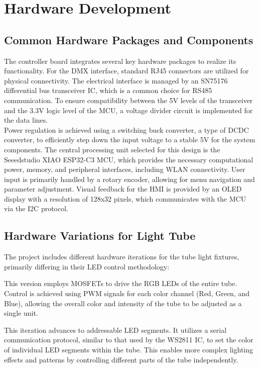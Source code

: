 \section{Hardware Development}
\label{sec:hardware_development}

\subsection{Common Hardware Packages and Components}

The controller board integrates several key hardware packages to realize its functionality. For the \ac{DMX} interface, standard \ac{RJ45} connectors are utilized for physical connectivity. The electrical interface is managed by an SN75176 differential bus transceiver \ac{IC}, which is a common choice for \ac{RS485} communication. To ensure compatibility between the 5V levels of the transceiver and the 3.3V logic level of the \ac{MCU}, a voltage divider circuit is implemented for the data lines. \\

Power regulation is achieved using a switching buck converter, a type of \ac{DCDC} converter, to efficiently step down the input voltage to a stable 5V for the system components. The central processing unit selected for this design is the Seeedstudio XIAO ESP32-C3 \ac{MCU}, which provides the necessary computational power, memory, and peripheral interfaces, including \ac{WLAN} connectivity. User input is primarily handled by a rotary encoder, allowing for menu navigation and parameter adjustment. Visual feedback for the \ac{HMI} is provided by an \ac{OLED} display with a resolution of 128x32 pixels, which communicates with the \ac{MCU} via the \ac{I2C} protocol.

\subsection{Hardware Variations for Light Tube}
The project includes different hardware iterations for the tube light fixtures, primarily differing in their \ac{LED} control methodology:

\begin{description}[style=nextline]
	\item[Light Tube V2] This version employs \ac{MOSFET}s to drive the \ac{RGB} \ac{LED}s of the entire tube. Control is achieved using \ac{PWM} signals for each color channel (Red, Green, and Blue), allowing the overall color and intensity of the tube to be adjusted as a single unit.
	\item[Light Tube V3] This iteration advances to addressable \ac{LED} segments. It utilizes a serial communication protocol, similar to that used by the WS2811 \ac{IC}, to set the color of individual \ac{LED} segments within the tube. This enables more complex lighting effects and patterns by controlling different parts of the tube independently.
\end{description}

